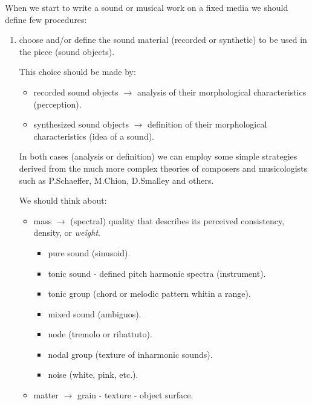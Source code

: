 When we start to write a sound or musical work on a fixed media we should define few procedures:

\begin{enumerate}
\tightlist
\item choose and/or define the sound material (recorded or synthetic) to be used in the piece (sound objects).

  This choice should be made by:

  \begin{itemize}
  \tightlist
  \item recorded sound objects \(\rightarrow\) analysis of their morphological characteristics (perception).
  \item synthesized sound objects \(\rightarrow\) definition of their morphological characteristics (idea of a sound).
  \end{itemize}

  In both cases (analysis or definition) we can employ some simple strategies derived from the much more complex theories of composers and musicologists such as P.Schaeffer, M.Chion, D.Smalley and others.

  We should think about:

  \begin{itemize}
  \tightlist
  \item mass \(\rightarrow\) (spectral) quality that describes its perceived consistency, density, or \textit{weight}.
    \begin{itemize}
    \tightlist
    \item pure sound (sinusoid).
    \item tonic sound - defined pitch harmonic spectra (instrument).
    \item tonic group (chord or melodic pattern whitin a range).
    \item mixed sound (ambiguos).
    \item node (tremolo or ribattuto).
    \item nodal group (texture of inharmonic sounds).
    \item noise (white, pink, etc.).
    \end{itemize}
  \item
    matter \(\rightarrow\) grain - texture - object surface.


\end{itemize}
\end{enumerate}
